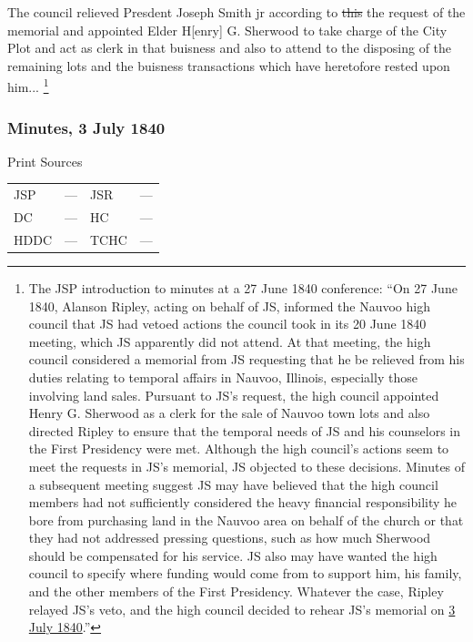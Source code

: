 				The council relieved Presdent Joseph Smith jr according to \sout{this} the request of the memorial and appointed Elder H[enry] G. Sherwood to take charge of the City Plot and act as clerk in that buisness and also to attend to the disposing of the remaining lots and the buisness transactions which have heretofore rested upon him...%
					\footnote{%
						The JSP introduction to minutes at a 27 June 1840 conference: ``On 27 June 1840, Alanson Ripley, acting on behalf of JS, informed the Nauvoo high council that JS had vetoed actions the council took in its 20 June 1840 meeting, which JS apparently did not attend. At that meeting, the high council considered a memorial from JS requesting that he be relieved from his duties relating to temporal affairs in Nauvoo, Illinois, especially those involving land sales. Pursuant to JS's request, the high council appointed Henry G. Sherwood as a clerk for the sale of Nauvoo town lots and also directed Ripley to ensure that the temporal needs of JS and his counselors in the First Presidency were met. Although the high council's actions seem to meet the requests in JS's memorial, JS objected to these decisions. Minutes of a subsequent meeting suggest JS may have believed that the high council members had not sufficiently considered the heavy financial responsibility he bore from purchasing land in the Nauvoo area on behalf of the church or that they had not addressed pressing questions, such as how much Sherwood should be compensated for his service. JS also may have wanted the high council to specify where funding would come from to support him, his family, and the other members of the First Presidency. Whatever the case, Ripley relayed JS's veto, and the high council decided to rehear JS's memorial on \hyperref[EMS-1840-JS-3-JUL-1840]{3 July 1840}.''
						}
						
		\subsubsection{Minutes, 3 July 1840}
			\label{EMS-1840-JS-3-JUL-1840}
			
			\begin{description}
				\item[Print Sources]
			\end{description}

			\begin{tabular}{p{0.5in}p{1in}p{0.5in}p{1in}}
				JSP	 	& ---		& JSR 		& --- \\
				DC	 	& ---		& HC 		& --- \\
				HDDC 	& ---		& TCHC 		& --- \\
			\end{tabular}
			
